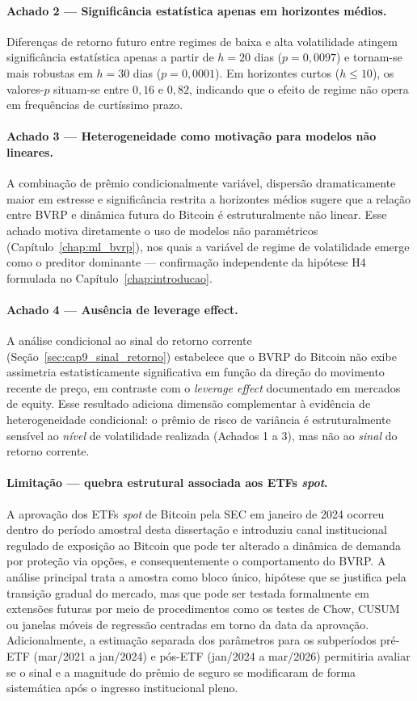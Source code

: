 \paragraph{Achado 2 --- Significância estatística apenas em horizontes médios.} Diferenças de retorno futuro entre regimes de baixa e alta volatilidade atingem significância estatística apenas a partir de $h = 20$ dias ($p = 0{,}0097$) e tornam-se mais robustas em $h = 30$ dias ($p = 0{,}0001$). Em horizontes curtos ($h \leq 10$), os valores-$p$ situam-se entre $0{,}16$ e $0{,}82$, indicando que o efeito de regime não opera em frequências de curtíssimo prazo.

\paragraph{Achado 3 --- Heterogeneidade como motivação para modelos não lineares.} A combinação de prêmio condicionalmente variável, dispersão dramaticamente maior em estresse e significância restrita a horizontes médios sugere que a relação entre BVRP e dinâmica futura do Bitcoin é estruturalmente não linear. Esse achado motiva diretamente o uso de modelos não paramétricos (Capítulo~\ref{chap:ml_bvrp}), nos quais a variável de regime de volatilidade emerge como o preditor dominante --- confirmação independente da hipótese H4 formulada no Capítulo~\ref{chap:introducao}.


\paragraph{Achado 4 --- Ausência de leverage effect.} A análise condicional ao sinal do retorno corrente (Seção~\ref{sec:cap9_sinal_retorno}) estabelece que o BVRP do Bitcoin não exibe assimetria estatisticamente significativa em função da direção do movimento recente de preço, em contraste com o \textit{leverage effect} documentado em mercados de equity. Esse resultado adiciona dimensão complementar à evidência de heterogeneidade condicional: o prêmio de risco de variância é estruturalmente sensível ao \textit{nível} de volatilidade realizada (Achados 1 a 3), mas não ao \textit{sinal} do retorno corrente.

\paragraph{Limitação --- quebra estrutural associada aos ETFs \textit{spot}.} A aprovação dos ETFs \textit{spot} de Bitcoin pela SEC em janeiro de 2024 ocorreu dentro do período amostral desta dissertação e introduziu canal institucional regulado de exposição ao Bitcoin que pode ter alterado a dinâmica de demanda por proteção via opções, e consequentemente o comportamento do BVRP. A análise principal trata a amostra como bloco único, hipótese que se justifica pela transição gradual do mercado, mas que pode ser testada formalmente em extensões futuras por meio de procedimentos como os testes de Chow, CUSUM ou janelas móveis de regressão centradas em torno da data da aprovação. Adicionalmente, a estimação separada dos parâmetros para os subperíodos pré-ETF (mar/2021 a jan/2024) e pós-ETF (jan/2024 a mar/2026) permitiria avaliar se o sinal e a magnitude do prêmio de seguro se modificaram de forma sistemática após o ingresso institucional pleno.
